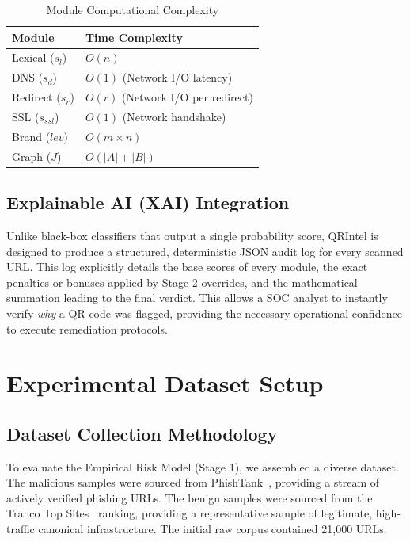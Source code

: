 \documentclass[10pt,twocolumn,letterpaper]{article}
\begin{document}
\begin{table}[h]
\centering
\caption{Module Computational Complexity}
\begin{tabular}{ll}
\toprule
\textbf{Module} & \textbf{Time Complexity} \\
\midrule
Lexical ($s_l$) & $O(n)$ \\
DNS ($s_d$) & $O(1)$ (Network I/O latency) \\
Redirect ($s_r$) & $O(r)$ (Network I/O per redirect) \\
SSL ($s_{ssl}$) & $O(1)$ (Network handshake) \\
Brand ($lev$) & $O(m \times n)$ \\
Graph ($J$) & $O(|A| + |B|)$ \\
\bottomrule
\end{tabular}
\end{table}

\subsection{Explainable AI (XAI) Integration}
Unlike black-box classifiers that output a single probability score, QRIntel is designed to produce a structured, deterministic JSON audit log for every scanned URL. This log explicitly details the base scores of every module, the exact penalties or bonuses applied by Stage 2 overrides, and the mathematical summation leading to the final verdict. This allows a SOC analyst to instantly verify \textit{why} a QR code was flagged, providing the necessary operational confidence to execute remediation protocols.

\section{Experimental Dataset Setup}

\subsection{Dataset Collection Methodology}
To evaluate the Empirical Risk Model (Stage 1), we assembled a diverse dataset. The malicious samples were sourced from PhishTank~\cite{PhishTank}, providing a stream of actively verified phishing URLs. The benign samples were sourced from the Tranco Top Sites~\cite{LePochat2019} ranking, providing a representative sample of legitimate, high-traffic canonical infrastructure. The initial raw corpus contained 21,000 URLs.
\end{document}
